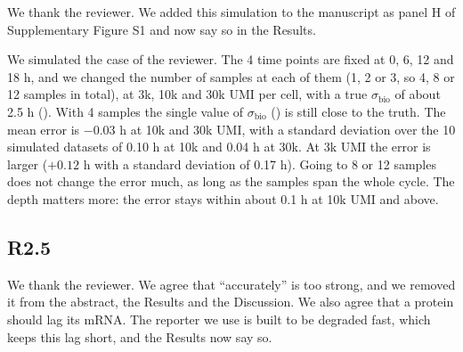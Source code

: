 \response
We thank the reviewer. We added this simulation to the manuscript as panel H of Supplementary Figure S1 and now say so in the Results.

We simulated the case of the reviewer. The 4 time points are fixed at 0, 6, 12 and 18 h, and we changed the number of samples at each of them (1, 2 or 3, so 4, 8 or 12 samples in total), at 3k, 10k and 30k UMI per cell, with a true $\sigma_{\text{bio}}$ of about 2.5 h (). With 4 samples the single value of $\sigma_{\text{bio}}$ () is still close to the truth. The mean error is $-0.03$ h at 10k and 30k UMI, with a standard deviation over the 10 simulated datasets of 0.10 h at 10k and 0.04 h at 30k. At 3k UMI the error is larger ($+0.12$ h with a standard deviation of 0.17 h). Going to 8 or 12 samples does not change the error much, as long as the samples span the whole cycle. The depth matters more: the error stays within about 0.1 h at 10k UMI and above.

\figReplicates


\subsection*{R2.5}


\response
We thank the reviewer. We agree that ``accurately'' is too strong, and we removed it from the abstract, the Results and the Discussion. We also agree that a protein should lag its mRNA. The reporter we use is built to be degraded fast, which keeps this lag short, and the Results now say so.


